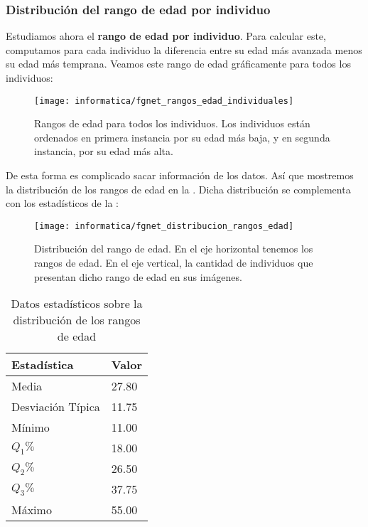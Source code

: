 \subsubsection{Distribución del rango de edad por individuo} \label{isubsubs:fgnet_rango_edades}

Estudiamos ahora el \textbf{rango de edad por individuo}. Para calcular este, computamos para cada individuo la diferencia entre su edad más avanzada menos su edad más temprana. Veamos este rango de edad gráficamente para todos los individuos:

\begin{figure}[!hbtp]
    \centering
    \texttt{[image: informatica/fgnet\_rangos\_edad\_individuales]}
    \caption{Rangos de edad para todos los individuos. Los individuos están ordenados en primera instancia por su edad más baja, y en segunda instancia, por su edad más alta.}
    \label{img:fgnet_rangos_individuales}
\end{figure}

De esta forma es complicado sacar información de los datos. Así que mostremos la distribución de los rangos de edad en la . Dicha distribución se complementa con los estadísticos de la :

\begin{figure}[h!]
    \centering
    \texttt{[image: informatica/fgnet\_distribucion\_rangos\_edad]}
    \caption{Distribución del rango de edad. En el eje horizontal tenemos los rangos de edad. En el eje vertical, la cantidad de individuos que presentan dicho rango de edad en sus imágenes.}
    \label{img:fgnet_rangos_distribucion}
\end{figure}

\begin{table}[h!]
\centering
\begin{tabular}{|l|l|}
    \hline
    \textbf{Estadística} & \textbf{Valor} \\
    \hline

    Media             & 27.80 \\
    Desviación Típica & 11.75 \\
    Mínimo            & 11.00 \\
    $Q_1 \%$          & 18.00 \\
    $Q_2 \%$          & 26.50 \\
    $Q_3 \%$          & 37.75 \\
    Máximo            & 55.00 \\

    \hline

\end{tabular}
\caption{Datos estadísticos sobre la distribución de los rangos de edad}
\label{table:fgnet_rangos_estadisticas}
\end{table}

